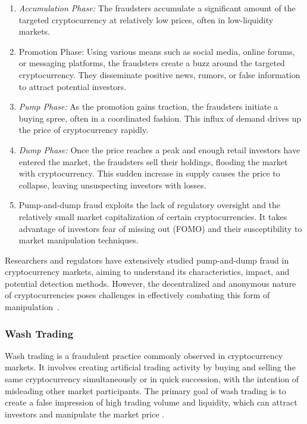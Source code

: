 \begin{enumerate}
    \item \textit{Accumulation Phase:} The fraudsters accumulate a significant amount of the targeted cryptocurrency at
    relatively low prices, often in low-liquidity markets.
    \item Promotion Phase: Using various means such as social media, online forums, or messaging platforms, the
    fraudsters create a buzz around the targeted cryptocurrency. They disseminate positive news, rumors, or false
    information to attract potential investors.
    \item \textit{Pump Phase:} As the promotion gains traction, the fraudsters initiate a buying spree, often in a
    coordinated fashion. This influx of demand drives up the price of cryptocurrency rapidly.
    \item \textit{Dump Phase:} Once the price reaches a peak and enough retail investors have entered the market, the
    fraudsters sell their holdings, flooding the market with cryptocurrency. This sudden increase in supply causes the
    price to collapse, leaving unsuspecting investors with losses.
    \item Pump-and-dump fraud exploits the lack of regulatory oversight and the relatively small market capitalization
    of certain cryptocurrencies. It takes advantage of investors fear of missing out (FOMO) and their susceptibility to
    market manipulation techniques.
\end{enumerate}

Researchers and regulators have extensively studied pump-and-dump fraud in cryptocurrency markets, aiming to understand
its characteristics, impact, and potential detection methods. However, the decentralized and anonymous nature of
cryptocurrencies poses challenges in effectively combating this form of manipulation~\cite{jin2020pump, yang2019pump}.

\subsubsection{Wash Trading}
Wash trading is a fraudulent practice commonly observed in cryptocurrency markets. It involves creating artificial
trading activity by buying and selling the same cryptocurrency simultaneously or in quick succession, with the intention
of misleading other market participants. The primary goal of wash trading is to create a false impression of high
trading volume and liquidity, which can attract investors and manipulate the market price \cite{gandal2018price}.

